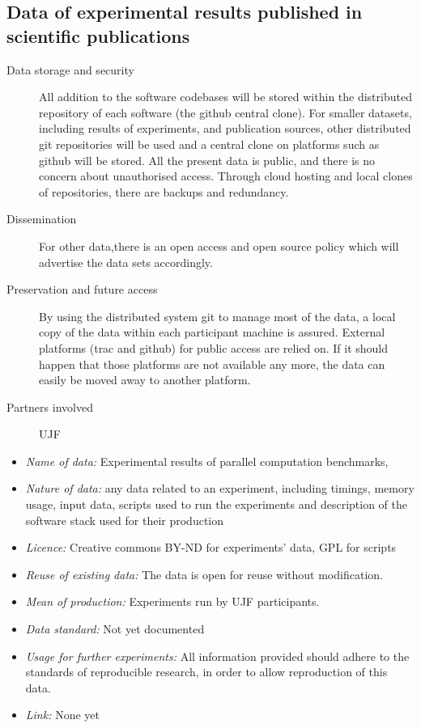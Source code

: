 \documentclass{deliverablereport}
\begin{document}
\begin{enumerate}
\subsection{Data of experimental results published in scientific publications}

\begin{description}
\item[Data storage and security] All addition to the software codebases will be stored within the distributed repository of each software (the github central clone). For smaller datasets, including results of experiments, and publication sources, other distributed git repositories will be used and a central clone on platforms such as github will be stored. All the present data is public, and there is no concern about unauthorised access. Through cloud hosting and local clones of repositories, there are backups and redundancy.
\item[Dissemination] For other data,there is an open access and open source policy which will advertise the data sets accordingly.
\item[Preservation and future access] By using the distributed system git to manage most of the data, a local copy of the data within each participant machine is assured. External platforms (trac and github) for public access are relied on. If it should happen that those platforms are not available any more, the data can easily be moved away to another platform.
\item[Partners involved] UJF
\end{description}

\begin{itemize}
\item\textit{Name of data:} Experimental results of parallel computation benchmarks,
\item\textit{Nature of data:} any data related to an experiment, including timings,
  memory usage, input data, scripts used to run the experiments and description
  of the software stack used for their production
\item\textit{Licence:} Creative commons BY-ND for experiments' data, GPL for scripts
\item\textit{Reuse of existing data:} The data is open for reuse without modification.
\item\textit{Mean of production:} Experiments run by UJF participants.
\item\textit{Data standard:} Not yet documented
\item\textit{Usage for further experiments:} All information provided should adhere to
  the standards of reproducible research, in order to allow reproduction of
  this data.
\item\textit{Link:} None yet
\end{itemize}




\end{enumerate}
\end{document}
